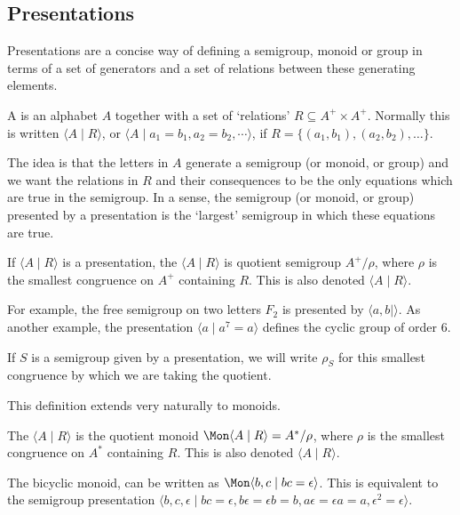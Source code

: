 \documentclass[noindex,noinsetproof,emphthm,12pt]{lmaths}
\begin{document}
\subsection{Presentations}

Presentations are a concise way of defining a semigroup, monoid or group in terms of a set of generators and a set of relations between these generating elements.

\begin{defn}
	A  is an alphabet $A$ together with a set of `relations' $R \subseteq A^+ \times A^+$. Normally this is written $\langle A \mid R\rangle$, or $\langle A \mid a_1 = b_1, a_2 = b_2, \cdots \rangle$, if $R = \{(a_1, b_1), (a_2, b_2), \ldots\}$.
\end{defn}

The idea is that the letters in $A$ generate a semigroup (or monoid, or group) and we want the relations in $R$ and their consequences to be the only equations which are true in the semigroup. In a sense, the semigroup (or monoid, or group) presented by a presentation is the `largest' semigroup in which these equations are true.

\begin{defn}
	If $\langle A \mid R \rangle$ is a presentation, the  $\langle A \mid R\rangle$ is quotient semigroup $A^+/\rho$, where $\rho$ is the smallest congruence on $A^+$ containing $R$. This is also denoted $\langle A \mid R \rangle$.
\end{defn}

For example, the free semigroup on two letters $F_2$ is presented by $\langle a, b \mid \rangle$. As another example, the presentation $\langle a \mid a^7 = a \rangle$ defines the cyclic group of order 6.

If $S$ is a semigroup given by a presentation, we will write $\rho_S$ for this smallest congruence by which we are taking the quotient.

This definition extends very naturally to monoids.

\begin{defn}
	The  $\langle A \mid R\rangle$ is the quotient monoid $\Mon \langle A \mid R\rangle = A^*/\rho$, where $\rho$ is the smallest congruence on $A^*$ containing $R$. This is also denoted $\langle A \mid R \rangle$.
\end{defn}

\begin{example}
The bicyclic monoid, can be written as $\Mon \langle b, c \mid bc = \epsilon \rangle$. This is equivalent to the semigroup presentation $\langle b, c, \epsilon \mid bc = \epsilon, b\epsilon = \epsilon b = b, a\epsilon = \epsilon a = a, \epsilon^2 = \epsilon \rangle$.
\end{example}
\end{document}
